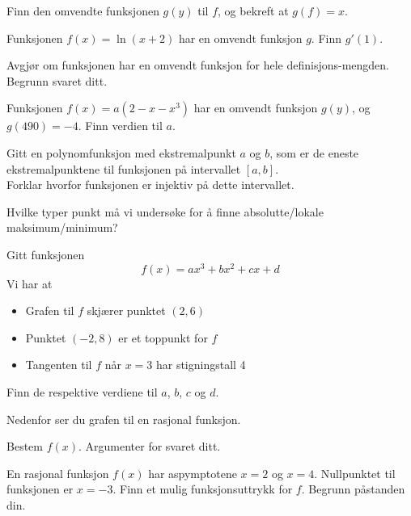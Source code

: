 Finn den omvendte funksjonen $ g(y) $ til $ f $, og bekreft at $ g(f)=x $. \os
{}

Funksjonen $f(x)=\ln(x+2)$ har en omvendt funksjon $g$. Finn $g'(1)$.


Avgjør om funksjonen har en omvendt funksjon for hele definisjons-mengden. Begrunn svaret ditt.

Funksjonen $ f(x)=a(2-x-x^3) $ har en omvendt funksjon $ g(y) $, og $ g(490)= -4$. Finn verdien til $ a $.

Gitt en polynomfunksjon med ekstremalpunkt $ a $ og $ b $, som er de eneste ekstremalpunktene til funksjonen på intervallet $ [a, b] $. \\ Forklar hvorfor funksjonen er injektiv på dette intervallet.

\newpage
{}
Hvilke typer punkt må vi undersøke for å finne absolutte/lokale maksimum/minimum?

Gitt funksjonen
\[ f(x)=ax^3+bx^2+cx+d \]
Vi har at
\begin{itemize}
	\item Grafen til $f$ skjærer punktet $(2, 6)$
	\item Punktet $(-2, 8) $ er et toppunkt for $f$
	\item Tangenten til $f$ når $x=3$ har stigningstall 4
\end{itemize}
Finn de respektive verdiene til $a$, $b$, $c$ og $d$.

Nedenfor ser du grafen til en rasjonal funksjon.\os

Bestem $ f(x) $. Argumenter for svaret ditt.

En rasjonal funksjon $f(x)$ har aspymptotene $x=2$ og $x=4$. Nullpunktet til funksjonen er $x=-3$. Finn et mulig funksjonsuttrykk for $f$. Begrunn påstanden din.

\newpage
{}

